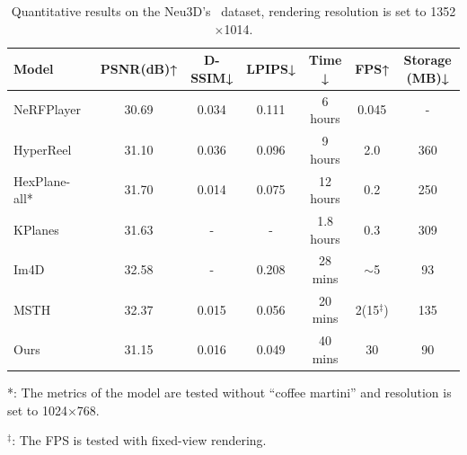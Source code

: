\begin{table} 
\centering
\caption{Quantitative results on the Neu3D's~\cite{li2022neural} dataset, rendering resolution is set to 1352$\times$1014.}
\setlength{\tabcolsep}{8pt}
\begin{tabular}{l|ccc|c|cc}  
\toprule
Model  & PSNR(dB)↑ & D-SSIM↓ & LPIPS↓ & Time ↓  & FPS↑ & Storage (MB)↓ \\ 
\midrule 
NeRFPlayer~\cite{song2023nerfplayer}  & 30.69 &  0.034  & 0.111  &  6 hours& 0.045&-\\  
HyperReel~\cite{attal2023hyperreel} &31.10&0.036&0.096&9 hours&2.0&360\\
HexPlane-all*~\cite{hexplane} & 31.70 & \cellcolor{pink}0.014 & 0.075 & 12 hours &0.2&250\\ 
KPlanes~\cite{kplanes}& 31.63& -   &  - &   1.8 hours  &0.3&309\\
Im4D~\cite{lin2023im4d}&\cellcolor{pink}32.58&-&0.208&\cellcolor{yellow}28 mins&$\sim$5&\cellcolor{yellow}93\\
MSTH~\cite{msth}&\cellcolor{yellow}32.37&\cellcolor{yellow}0.015&\cellcolor{yellow}0.056&\cellcolor{pink}20 mins & \cellcolor{yellow}2(15$^\ddag$)&135\\
Ours& 31.15 & 0.016 &\cellcolor{pink}0.049 & 40 mins  &\cellcolor{pink}30 & \cellcolor{pink}90\\
\hline  
\end{tabular}  

 \begin{tablenotes}
        \footnotesize
        \item[*] *: The metrics of the model are tested without ``coffee martini'' and resolution is set to 1024$\times$768. 
        \item [$^\ddag$] $^\ddag$: The FPS is tested with fixed-view rendering.
        \end{tablenotes}\label{tab:dynerf}

\end{table}

